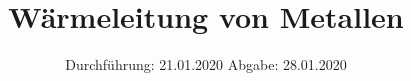 

\subject{Versuch 204}
\title{Wärmeleitung von Metallen}
\date{%
  Durchführung: 21.01.2020
  \hspace{3em}
  Abgabe: 28.01.2020
}



\maketitle
\thispagestyle{empty}
\tableofcontents
\newpage






\nocite{*}
\printbibliography{}


